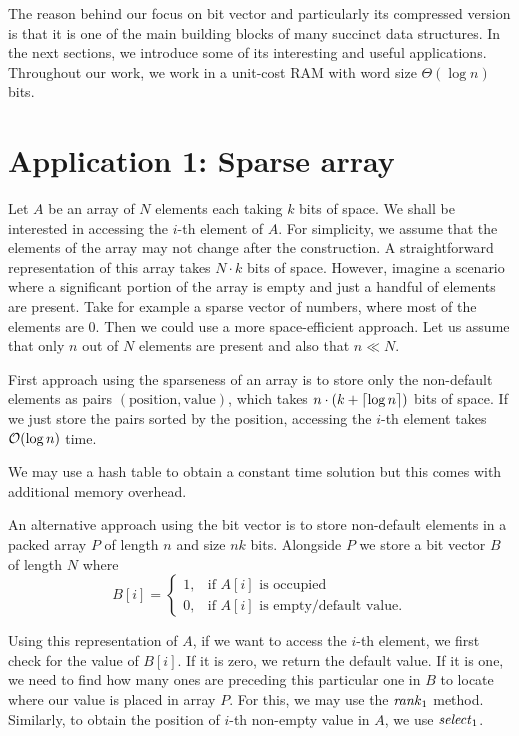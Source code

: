 The reason behind our focus on bit vector and particularly its compressed version
is that it is one of the main building blocks of many succinct data structures.
In the next sections, we introduce some of its interesting and useful applications.
Throughout our work, we work in a unit-cost RAM with word size $\Theta(\log n)$ bits.

\section{Application 1: Sparse array}

Let $A$ be an array of $N$ elements each taking $k$ bits of space. We shall be interested in
accessing the $i$-th element of $A$. For simplicity, we assume that the elements of the array may
not change after the construction. A straightforward representation of this array takes $N\cdot k$
bits of space. However, imagine a scenario where a significant portion of the array is empty
and just a handful of elements are present. Take for example a sparse vector of numbers,
where most of the elements are 0. Then we could use a more space-efficient approach.
Let us assume that only $n$ out of $N$ elements are present and also that $n\ll N$.

First approach using the sparseness of an array is to store only the non-default elements as
pairs $(\text{position}, \text{value})$, which takes $n\cdot (k+\left\lceil \log n \right\rceil)$ bits of space.
If we just store the pairs sorted by the position, accessing the $i$-th element takes $\mathcal{O}(\log n)$ time.

We may use a hash table to obtain a constant time solution but this comes with additional
memory overhead.

An alternative approach using the bit vector is to store non-default elements in
a packed array $P$ of length $n$ and size $nk$ bits. Alongside $P$ we store a bit vector $B$ of length
$N$ where
\[
   B[i]=
\begin{cases}
   1,& \text{if $A[i]$ is occupied} \\
   0,& \text{if $A[i]$ is empty/default value.}
\end{cases}
\]

Using this representation of $A$, if we want to access the $i$-th element, we first check for
the value of $B[i]$. If it is zero, we return the default value. If it is one, we need to find
how many ones are preceding this particular one in $B$ to locate where our value is placed in
array $P$. For this, we may use the $\mathit{rank}_1$ method. Similarly, to obtain the position of $i$-th
non-empty value in $A$, we use $\mathit{select}_1$.

